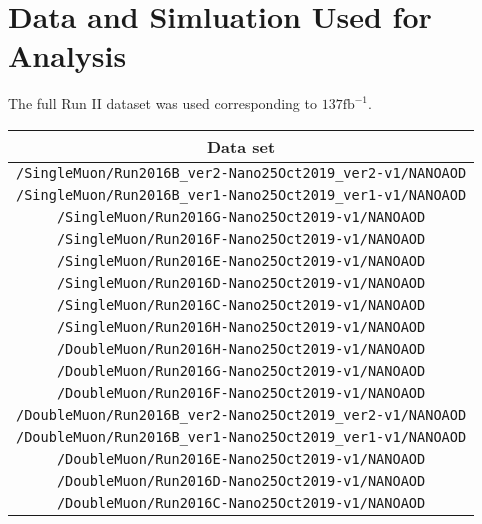 \section{Data and Simluation Used for Analysis}
The full Run II dataset was used corresponding to $137 \text{fb}^{-1}$.
\begin{table}[!h]
\label{tab:datasets2016}
\begin{center}
{\footnotesize
\begin{tabular}{c}
\hline
Data set  \\
\hline
\texttt{/SingleMuon/Run2016B\_ver2-Nano25Oct2019\_ver2-v1/NANOAOD} \\
\texttt{/SingleMuon/Run2016B\_ver1-Nano25Oct2019\_ver1-v1/NANOAOD}   \\
\texttt{/SingleMuon/Run2016G-Nano25Oct2019-v1/NANOAOD} \\
\texttt{/SingleMuon/Run2016F-Nano25Oct2019-v1/NANOAOD} \\
\texttt{/SingleMuon/Run2016E-Nano25Oct2019-v1/NANOAOD} \\
\texttt{/SingleMuon/Run2016D-Nano25Oct2019-v1/NANOAOD} \\
\texttt{/SingleMuon/Run2016C-Nano25Oct2019-v1/NANOAOD} \\
\texttt{/SingleMuon/Run2016H-Nano25Oct2019-v1/NANOAOD} \\
\texttt{/DoubleMuon/Run2016H-Nano25Oct2019-v1/NANOAOD} \\
\texttt{/DoubleMuon/Run2016G-Nano25Oct2019-v1/NANOAOD} \\
\texttt{/DoubleMuon/Run2016F-Nano25Oct2019-v1/NANOAOD} \\
\texttt{/DoubleMuon/Run2016B\_ver2-Nano25Oct2019\_ver2-v1/NANOAOD} \\
\texttt{/DoubleMuon/Run2016B\_ver1-Nano25Oct2019\_ver1-v1/NANOAOD} \\
\texttt{/DoubleMuon/Run2016E-Nano25Oct2019-v1/NANOAOD} \\
\texttt{/DoubleMuon/Run2016D-Nano25Oct2019-v1/NANOAOD} \\
\texttt{/DoubleMuon/Run2016C-Nano25Oct2019-v1/NANOAOD} \\
\hline
\end{tabular}
} %
\end{center}
\end{table}

